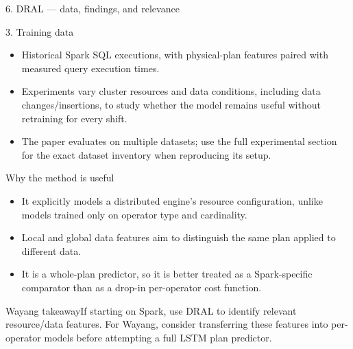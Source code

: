 \documentclass[aspectratio=169,10pt]{beamer}
\newcommand{\takeaway}[1]{\begin{block}{Wayang takeaway}#1\end{block}}
\begin{document}
\begin{frame}[shrink=10]{6. DRAL — data, findings, and relevance}
\small
\begin{block}{3. Training data}
\begin{itemize}\setlength\itemsep{2pt}
  \item Historical Spark SQL executions, with physical-plan features paired with measured query execution times.
  \item Experiments vary cluster resources and data conditions, including data changes/insertions, to study whether the model remains useful without retraining for every shift.
  \item The paper evaluates on multiple datasets; use the full experimental section for the exact dataset inventory when reproducing its setup.
\end{itemize}
\end{block}
\begin{block}{Why the method is useful}
\begin{itemize}\setlength\itemsep{2pt}
  \item It explicitly models a distributed engine's resource configuration, unlike models trained only on operator type and cardinality.
  \item Local and global data features aim to distinguish the same plan applied to different data.
  \item It is a whole-plan predictor, so it is better treated as a Spark-specific comparator than as a drop-in per-operator cost function.
\end{itemize}
\end{block}
\takeaway{If starting on Spark, use DRAL to identify relevant resource/data features. For Wayang, consider transferring these features into per-operator models before attempting a full LSTM plan predictor.}
\end{frame}
\end{document}
